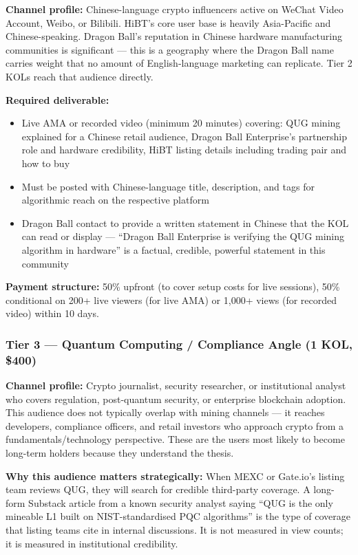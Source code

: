 \documentclass[11pt,a4paper]{article}
\begin{document}
\textbf{Channel profile:} Chinese-language crypto influencers active on WeChat Video Account, Weibo, or Bilibili. HiBT's core user base is heavily Asia-Pacific and Chinese-speaking. Dragon Ball's reputation in Chinese hardware manufacturing communities is significant — this is a geography where the Dragon Ball name carries weight that no amount of English-language marketing can replicate. Tier 2 KOLs reach that audience directly.

\textbf{Required deliverable:}
\begin{itemize}[leftmargin=1em, itemsep=0pt]
  \item Live AMA or recorded video (minimum 20 minutes) covering: QUG mining explained for a Chinese retail audience, Dragon Ball Enterprise's partnership role and hardware credibility, HiBT listing details including trading pair and how to buy
  \item Must be posted with Chinese-language title, description, and tags for algorithmic reach on the respective platform
  \item Dragon Ball contact to provide a written statement in Chinese that the KOL can read or display — ``Dragon Ball Enterprise is verifying the QUG mining algorithm in hardware'' is a factual, credible, powerful statement in this community
\end{itemize}

\textbf{Payment structure:} 50\% upfront (to cover setup costs for live sessions), 50\% conditional on 200+ live viewers (for live AMA) or 1,000+ views (for recorded video) within 10 days.

\subsubsection{Tier 3 — Quantum Computing / Compliance Angle (1 KOL, \$400)}

\textbf{Channel profile:} Crypto journalist, security researcher, or institutional analyst who covers regulation, post-quantum security, or enterprise blockchain adoption. This audience does not typically overlap with mining channels — it reaches developers, compliance officers, and retail investors who approach crypto from a fundamentals/technology perspective. These are the users most likely to become long-term holders because they understand the thesis.

\textbf{Why this audience matters strategically:} When MEXC or Gate.io's listing team reviews QUG, they will search for credible third-party coverage. A long-form Substack article from a known security analyst saying ``QUG is the only mineable L1 built on NIST-standardised PQC algorithms'' is the type of coverage that listing teams cite in internal discussions. It is not measured in view counts; it is measured in institutional credibility.
\end{document}
